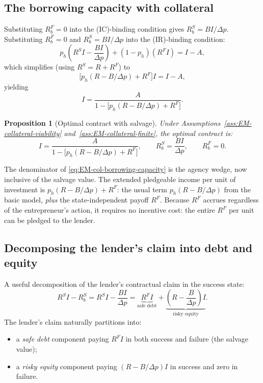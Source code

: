 \documentclass[11pt,a4paper,oneside]{book}
\theoremstyle{plain}
\newtheorem{proposition}[theorem]{Proposition}
\theoremstyle{definition}
\theoremstyle{remark}
\numberwithin{equation}{chapter}
\begin{document}
\subsection{The borrowing capacity with collateral}

Substituting $R_b^F = 0$ into the (IC)-binding condition gives $R_b^S = B I / \Delta p$.
Substituting $R_b^F = 0$ and $R_b^S = B I / \Delta p$ into the (IR)-binding condition:
\begin{equation*}
  p_h \left( R^S I - \frac{B I}{\Delta p} \right) + (1 - p_h)(R^F I) = I - A,
\end{equation*}
which simplifies (using $R^S = R + R^F$) to
\begin{equation}\label{eq:EM-col-IR-simplified}
  \bigl[ p_h(R - B/\Delta p) + R^F \bigr] I = I - A,
\end{equation}
yielding
\begin{equation}\label{eq:EM-col-borrowing-capacity}
  I = \frac{A}{1 - \bigl[ p_h(R - B/\Delta p) + R^F \bigr]}.
\end{equation}

\begin{proposition}[Optimal contract with salvage]\label{prop:EM-col-contract}
Under Assumptions~\ref{ass:EM-collateral-viability} and~\ref{ass:EM-collateral-finite}, the optimal contract is:
\begin{equation*}
  I = \frac{A}{1 - \bigl[ p_h(R - B/\Delta p) + R^F \bigr]},
  \qquad
  R_b^S = \frac{B I}{\Delta p},
  \qquad
  R_b^F = 0.
\end{equation*}
\end{proposition}

The denominator of \eqref{eq:EM-col-borrowing-capacity} is the agency wedge, now inclusive of the salvage value.
The extended pledgeable income per unit of investment is $p_h(R - B/\Delta p) + R^F$: the usual term $p_h(R - B/\Delta p)$ from the basic model, \emph{plus} the state-independent payoff $R^F$.
Because $R^F$ accrues regardless of the entrepreneur's action, it requires no incentive cost: the entire $R^F$ per unit can be pledged to the lender.

\subsection{Decomposing the lender's claim into debt and equity}

A useful decomposition of the lender's contractual claim in the success state:
\begin{equation*}
  R^S I - R_b^S = R^S I - \frac{B I}{\Delta p}
  = \underbrace{R^F I}_{\text{safe debt}} + \underbrace{\left(R - \frac{B}{\Delta p}\right) I}_{\text{risky equity}}.
\end{equation*}
The lender's claim naturally partitions into:
\begin{itemize}
  \item a \emph{safe debt} component paying $R^F I$ in both success and failure (the salvage value);
  \item a \emph{risky equity} component paying $(R - B/\Delta p) I$ in success and zero in failure.
\end{itemize}
\end{document}
